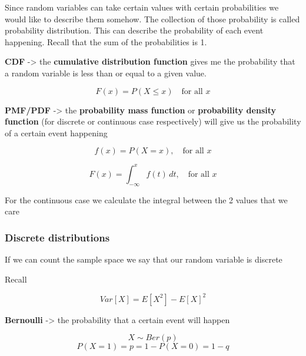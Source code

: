 \vspace{10pt}

Since random variables can take certain values with certain probabilities we would like to describe them somehow. The collection of those probability is called probability distribution. This can describe the probability of each event happening. Recall that the sum of the probabilities is 1.

\vspace{10pt}

\textbf{CDF} -> the \textbf{cumulative distribution function} gives me the probability that a random variable is less than or equal to a given value. 

\begin{equation}
    F(x) = P(X \le x) \quad \text{for all } x
\end{equation}


\textbf{PMF/PDF} -> the \textbf{probability mass function} or \textbf{probability density function} (for discrete or continuous case respectively) will give us the probability of a certain event happening

\begin{equation}
    f(x) = P(X = x), \quad \text{for all } x
\end{equation}

\begin{equation}
F(x) = \int_{-\infty}^{x} f(t)\,dt, \quad \text{for all } x
\end{equation}

For the continuous case we calculate the integral between the 2 values that we care 

\vspace{10pt}

\subsubsection{Discrete distributions}

If we can count the sample space we say that our random variable is discrete

Recall

\begin{equation}
    Var[X] = E[X^2] - E[X]^2
\end{equation}

\vspace{20pt}

\textbf{Bernoulli} -> the probability that a certain event will happen

\begin{equation}
    X \sim Ber(p)
\end{equation}
\begin{equation}
    P(X=1) = p = 1 -P(X=0) = 1-q
\end{equation}

